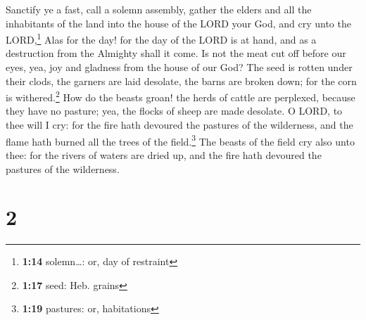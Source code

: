  Sanctify ye a fast, call a solemn assembly, gather the
elders and all the inhabitants of the land into the house of the LORD
your God, and cry unto the LORD,\footnote{\textbf{1:14} solemn\ldots:
  or, day of restraint}  Alas for the day! for the day of
the LORD is at hand, and as a destruction from the Almighty shall it
come.  Is not the meat cut off before our eyes, yea, joy
and gladness from the house of our God?  The seed is
rotten under their clods, the garners are laid desolate, the barns are
broken down; for the corn is withered.\footnote{\textbf{1:17} seed: Heb.
  grains}  How do the beasts groan! the herds of cattle
are perplexed, because they have no pasture; yea, the flocks of sheep
are made desolate.  O LORD, to thee will I cry: for the
fire hath devoured the pastures of the wilderness, and the flame hath
burned all the trees of the field.\footnote{\textbf{1:19} pastures: or,
  habitations}  The beasts of the field cry also unto
thee: for the rivers of waters are dried up, and the fire hath devoured
the pastures of the wilderness.

\hypertarget{section-1}{%
\section{2}\label{section-1}}

